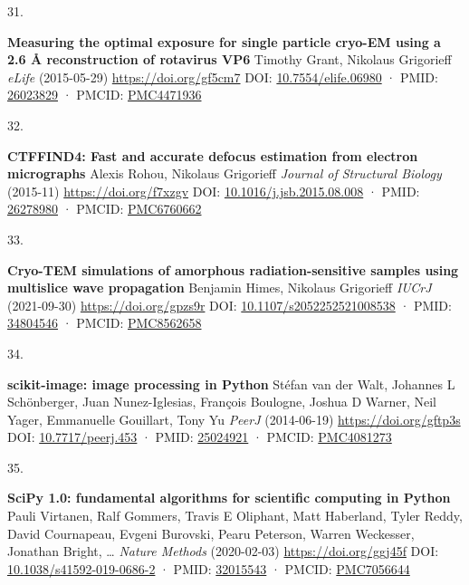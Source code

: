 \documentclass[
]{article}
\newlength{\cslhangindent}
\newlength{\csllabelwidth}
\newlength{\cslentryspacingunit} %
\newenvironment{CSLReferences}[2] %
 {%
  \setlength{\parindent}{0pt}
  \ifodd #1
  \let\oldpar\par
  \def\par{\hangindent=\cslhangindent\oldpar}
  \fi
  \setlength{\parskip}{#2\cslentryspacingunit}
 }%
 {}
\newcommand{\CSLBlock}[1]{#1\hfill\break}
\newcommand{\CSLLeftMargin}[1]{\parbox[t]{\csllabelwidth}{#1}}
\newcommand{\CSLRightInline}[1]{\parbox[t]{\linewidth - \csllabelwidth}{#1}\break}
\begin{document}
\begin{CSLReferences}{0}{0}
\leavevmode{}%
\CSLLeftMargin{31. }%
\CSLRightInline{\textbf{Measuring the optimal exposure for single particle cryo-EM using a 2.6 Å reconstruction of rotavirus VP6}
\CSLBlock{Timothy Grant, Nikolaus Grigorieff} \emph{eLife} (2015-05-29) \url{https://doi.org/gf5cm7}
\CSLBlock{DOI: \href{https://doi.org/10.7554/elife.06980}{10.7554/elife.06980} · PMID: \href{https://www.ncbi.nlm.nih.gov/pubmed/26023829}{26023829} · PMCID: \href{https://www.ncbi.nlm.nih.gov/pmc/articles/PMC4471936}{PMC4471936}}}

\leavevmode{}%
\CSLLeftMargin{32. }%
\CSLRightInline{\textbf{CTFFIND4: Fast and accurate defocus estimation from electron micrographs}
\CSLBlock{Alexis Rohou, Nikolaus Grigorieff} \emph{Journal of Structural Biology} (2015-11) \url{https://doi.org/f7xzgv}
\CSLBlock{DOI: \href{https://doi.org/10.1016/j.jsb.2015.08.008}{10.1016/j.jsb.2015.08.008} · PMID: \href{https://www.ncbi.nlm.nih.gov/pubmed/26278980}{26278980} · PMCID: \href{https://www.ncbi.nlm.nih.gov/pmc/articles/PMC6760662}{PMC6760662}}}

\leavevmode{}%
\CSLLeftMargin{33. }%
\CSLRightInline{\textbf{Cryo-TEM simulations of amorphous radiation-sensitive samples using multislice wave propagation}
\CSLBlock{Benjamin Himes, Nikolaus Grigorieff} \emph{IUCrJ} (2021-09-30) \url{https://doi.org/gpzs9r}
\CSLBlock{DOI: \href{https://doi.org/10.1107/s2052252521008538}{10.1107/s2052252521008538} · PMID: \href{https://www.ncbi.nlm.nih.gov/pubmed/34804546}{34804546} · PMCID: \href{https://www.ncbi.nlm.nih.gov/pmc/articles/PMC8562658}{PMC8562658}}}

\leavevmode{}%
\CSLLeftMargin{34. }%
\CSLRightInline{\textbf{scikit-image: image processing in Python}
\CSLBlock{Stéfan van der Walt, Johannes L Schönberger, Juan Nunez-Iglesias, François Boulogne, Joshua D Warner, Neil Yager, Emmanuelle Gouillart, Tony Yu} \emph{PeerJ} (2014-06-19) \url{https://doi.org/gftp3s}
\CSLBlock{DOI: \href{https://doi.org/10.7717/peerj.453}{10.7717/peerj.453} · PMID: \href{https://www.ncbi.nlm.nih.gov/pubmed/25024921}{25024921} · PMCID: \href{https://www.ncbi.nlm.nih.gov/pmc/articles/PMC4081273}{PMC4081273}}}

\leavevmode{}%
\CSLLeftMargin{35. }%
\CSLRightInline{\textbf{SciPy 1.0: fundamental algorithms for scientific computing in Python}
\CSLBlock{Pauli Virtanen, Ralf Gommers, Travis E Oliphant, Matt Haberland, Tyler Reddy, David Cournapeau, Evgeni Burovski, Pearu Peterson, Warren Weckesser, Jonathan Bright, \ldots{} } \emph{Nature Methods} (2020-02-03) \url{https://doi.org/ggj45f}
\CSLBlock{DOI: \href{https://doi.org/10.1038/s41592-019-0686-2}{10.1038/s41592-019-0686-2} · PMID: \href{https://www.ncbi.nlm.nih.gov/pubmed/32015543}{32015543} · PMCID: \href{https://www.ncbi.nlm.nih.gov/pmc/articles/PMC7056644}{PMC7056644}}}


\end{CSLReferences}
\end{document}
